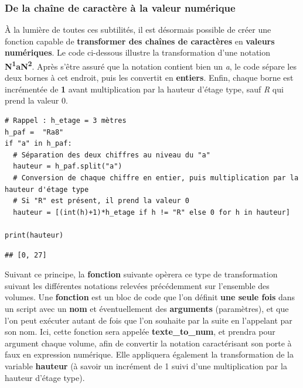 \documentclass[
  11pt,
  french,
]{article}
\begin{document}
\newpage

\hypertarget{de-la-chauxeene-de-caractuxe8re-uxe0-la-valeur-numuxe9rique}{%
\subsubsection{De la chaîne de caractère à la valeur
numérique}\label{de-la-chauxeene-de-caractuxe8re-uxe0-la-valeur-numuxe9rique}}

À la lumière de toutes ces subtilités, il est désormais possible de
créer une fonction capable de \textbf{transformer des chaînes de
caractères} en \textbf{valeurs numériques}. Le code ci-dessous illustre
la transformation d'une notation
\textbf{N\textsuperscript{1}aN\textsuperscript{2}}. Après s'être assuré
que la notation contient bien un \emph{a}, le code sépare les deux
bornes à cet endroit, puis les convertit en \textbf{entiers}. Enfin,
chaque borne est incrémentée de \textbf{1} avant multiplication par la
hauteur d'étage type, sauf \emph{R} qui prend la valeur 0.

\begin{tcolorbox}[title= Énumération des différentes notations ,colback=boitecode]
\begin{lstlisting}[style=code]
# Rappel : h_etage = 3 mètres
h_paf =  "Ra8"
if "a" in h_paf:
  # Séparation des deux chiffres au niveau du "a"
  hauteur = h_paf.split("a")
  # Conversion de chaque chiffre en entier, puis multiplication par la hauteur d'étage type
  # Si "R" est présent, il prend la valeur 0
  hauteur = [(int(h)+1)*h_etage if h != "R" else 0 for h in hauteur]

print(hauteur)\end{lstlisting}
\begin{lstlisting}[style=out]
## [0, 27]
\end{lstlisting}
\end{tcolorbox}

Suivant ce principe, la \textbf{fonction} suivante opèrera ce type de
transformation suivant les différentes notations relevées précédemment
sur l'ensemble des volumes. Une \textbf{fonction} est un bloc de code
que l'on définit \textbf{une seule fois} dans un script avec un
\textbf{nom} et éventuellement des \textbf{arguments} (paramètres), et
que l'on peut exécuter autant de fois que l'on souhaite par la suite en
l'appelant par son nom. Ici, cette fonction sera appelée
\textbf{texte\_to\_num}, et prendra pour argument chaque volume, afin de
convertir la notation caractérisant son porte à faux en expression
numérique. Elle appliquera également la transformation de la variable
\textbf{hauteur} (à savoir un incrément de 1 suivi d'une multiplication
par la hauteur d'étage type).
\end{document}
